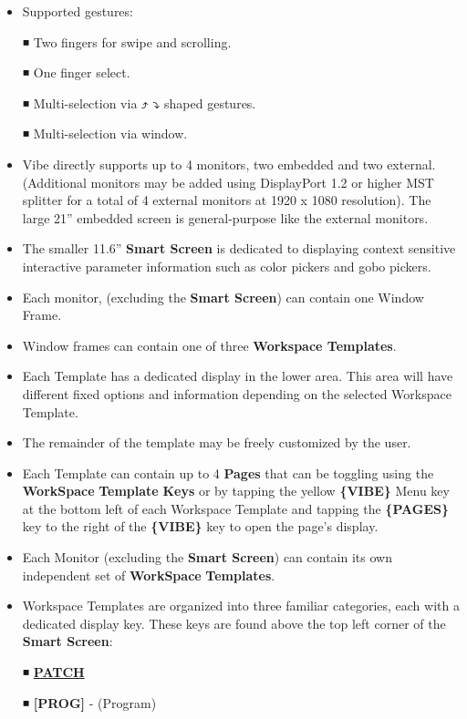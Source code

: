 \documentclass[
]{article}
\begin{document}
\begin{itemize}
\item
  Supported gestures:

  ◾ Two fingers for swipe and scrolling.

  ◾ One finger select.

  ◾ Multi-selection via ️️⤴ ⤵ shaped gestures.

  ◾ {Multi-selection via window.}
\item
  Vibe directly supports up to 4 monitors, two embedded and two external. (Additional monitors may be added using DisplayPort 1.2 or higher MST splitter for a total of 4 external monitors at 1920 x 1080 resolution). The large 21'' embedded screen is general-purpose like the external monitors.
\item
  The smaller 11.6'' \textbf{Smart Screen} is dedicated to displaying context sensitive interactive parameter information such as color pickers and gobo pickers.
\item
  Each monitor, (excluding the \textbf{Smart Screen}) can contain one Window Frame.
\item
  Window frames can contain one of three \textbf{Workspace Templates}.
\item
  Each Template has a dedicated display in the lower area. This area will have different fixed options and information depending on the selected Workspace Template.
\item
  The remainder of the template may be freely customized by the user.
\item
  Each Template can contain up to 4 \textbf{Pages} that can be toggling using the \textbf{WorkSpace} \textbf{Template} \textbf{Keys} or by tapping the yellow \textbf{\{VIBE\}} Menu key at the bottom left of each Workspace Template and tapping the \textbf{\{PAGES\}} key to the right of the \textbf{\{VIBE\}} key to open the page's display.
\item
  Each Monitor (excluding the \textbf{Smart Screen}) can contain its own independent set of \textbf{WorkSpace} \textbf{Templates}.
\item
  Workspace Templates are organized into three familiar categories, each with a dedicated display key. These keys are found above the top left corner of the \textbf{Smart Screen}:

  ◾ \textbf{\protect\hyperlink{patch}{PATCH}}

  ◾ \textbf{{[}PROG{]}} - (Program)


\end{itemize}
\end{document}
